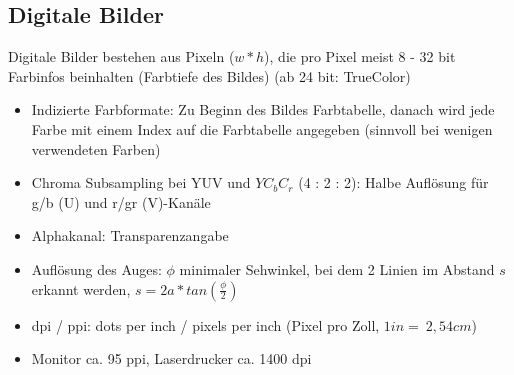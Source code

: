 \documentclass[12pt,landscape]{article}
\begin{document}
\begin{multicols}{3}
\subsection{Digitale Bilder}
Digitale Bilder bestehen aus Pixeln ($w * h$), die pro Pixel meist 8 - 32 bit Farbinfos beinhalten (Farbtiefe des Bildes) (ab 24 bit: TrueColor)
\begin{itemize}
\item Indizierte Farbformate: Zu Beginn des Bildes Farbtabelle, danach wird jede Farbe mit einem Index auf die Farbtabelle angegeben (sinnvoll bei wenigen verwendeten Farben)
\item Chroma Subsampling bei YUV und $YC_bC_r$ (4 : 2 : 2): Halbe Auflösung für g/b (U) und r/gr (V)-Kanäle
\item Alphakanal: Transparenzangabe
\item Auflösung des Auges: $\phi$ minimaler Sehwinkel, bei dem 2 Linien im Abstand $s$ erkannt werden, $s = 2a * tan(\frac{\phi}{2})$
\item dpi / ppi: dots per inch / pixels per inch (Pixel pro Zoll, $1 in = ~2,54cm$)
\item Monitor ca. 95 ppi, Laserdrucker ca. 1400 dpi
\end{itemize}

\end{multicols}
\end{document}
